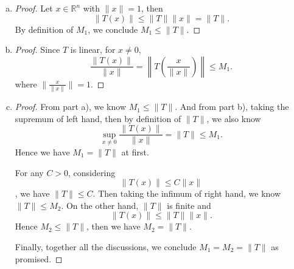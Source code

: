 \begin{Exercise}
\begin{enumerate}[a)]
\item 
\begin{proof}
Let $x \in \mathbb{R}^n$ with $\|x\|=1$, then
$$ \| T(x) \|
\leq \|T\| \|x\|
= \|T\|.$$
By definition of $M_1$, we conclude $M_1 \leq \|T\|$.
\end{proof}

\item
\begin{proof}
Since $T$ is linear, for $x \neq 0$,
$$ \frac{\|T(x)\|}{\|x\|}
= \left\| T\left( \frac{x}{\|x\|} \right) \right\|
\leq M_1.$$ where $ \| \frac{x}{\|x\|} \| = 1$.
\end{proof}

\item 
\begin{proof}
From part a), we know $M_1 \leq \|T\|$. And from part b), taking the supremum of left hand, then by definition of $\|T\|$, we also know $$\sup_{x\neq 0}\frac{\|T(x)\|}{\|x\|} = \|T\| \leq M_1.$$
Hence we have $M_1 = \|T\|$ at first.

\vspace{1ex}

For any $C>0$, considering $$\|T(x)\|\leq C\|x\|$$, we have $\|T\| \leq C$. Then taking the infimum of right hand, we know $\|T\| \leq M_2$. On the other hand, $\|T\|$ is finite and $$\|T(x)\| \leq \|T\|\|x\|.$$ Hence $M_2\leq \|T\|$, then we have $M_2 = \|T\|$.

\vspace{1ex}

Finally, together all the discussions, we conclude $M_1 = M_2 = \|T\|$ as promised.
\end{proof}
\end{enumerate}
\end{Exercise}